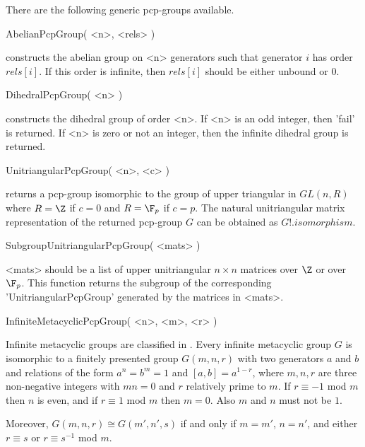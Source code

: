 

There are the following generic pcp-groups available.

\>AbelianPcpGroup( <n>, <rels> )

      constructs the   abelian  group  on  <n>  generators  such  that
      generator $i$ has  order $rels[i]$. If  this  order is infinite,
      then $rels[i]$ should be either unbound or 0.

\>DihedralPcpGroup( <n> )

      constructs the dihedral  group of order <n>. If <n>  is an odd
      integer, then 'fail' is returned.  If  <n> is zero or not an 
      integer, then the infinite dihedral group is returned.

\>UnitriangularPcpGroup( <n>, <c> )

      returns a pcp-group isomorphic  to the group of upper triangular
      in $GL(n, R)$ where $R = \Z$ if $c = 0$ and $R = \F_p$ if $c = p$.
      The natural unitriangular matrix representation of the returned 
      pcp-group $G$ can be obtained as $G!.isomorphism$.

\>SubgroupUnitriangularPcpGroup( <mats> )

      <mats> should be a list of upper unitriangular $n \times n$ 
      matrices over $\Z$ or over $\F_p$. This function returns the 
      subgroup of the corresponding 'UnitriangularPcpGroup' generated 
      by the matrices in <mats>.

\>InfiniteMetacyclicPcpGroup( <n>, <m>, <r> )

      Infinite metacyclic groups are classified in \cite{B-K00}. Every 
      infinite metacyclic group $G$ is isomorphic to a finitely presented 
      group $G(m,n,r)$ with two generators $a$ and $b$ and relations of the 
      form $a^n = b^m = 1$ and $[a,b] = a^{1-r}$, where $m,n,r$ are three
      non-negative integers with $mn=0$ and $r$ relatively prime to $m$. 
      If $r \equiv -1$ mod $m$ then $n$ is even, and if $r \equiv 1$ mod 
      $m$ then $m=0$. Also $m$ and $n$ must not be $1$.

      Moreover, $G(m,n,r)\cong G(m',n',s)$ if and only if $m=m'$, $n=n'$, 
      and either $r \equiv s$ or $r \equiv s^{-1}$ mod $m$. 

